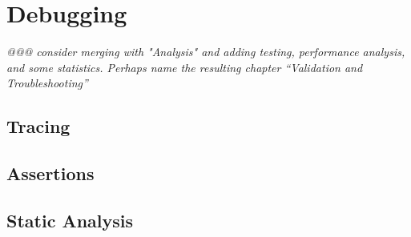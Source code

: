 
\chapter{Debugging}
\label{chp:Debugging}

\emph{@@@ consider merging with "Analysis" and adding testing,
performance analysis, and some statistics.  Perhaps name the
resulting chapter ``Validation and Troubleshooting''}

\section{Tracing}
\label{sec:debugging:Tracing}

\section{Assertions}
\label{sec:debugging:Assertions}

\section{Static Analysis}
\label{sec:debugging:Static Analysis}
